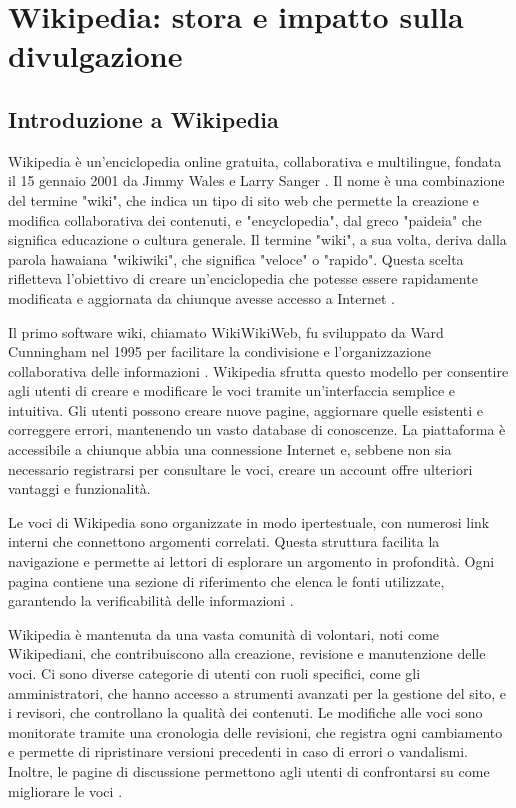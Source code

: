 \documentclass[12pt,a4paper]{report}
\begin{document}
\tableofcontents
\newpage

\chapter{Wikipedia: stora e impatto sulla divulgazione}

\section{Introduzione a Wikipedia}

Wikipedia è un'enciclopedia online gratuita, collaborativa e multilingue, fondata il 15 gennaio 2001 da Jimmy Wales e Larry Sanger \cite{lih2009wikipedia}. Il nome è una combinazione del termine "wiki", che indica un tipo di sito web che permette la creazione e modifica collaborativa dei contenuti, e "encyclopedia", dal greco "paideia" che significa educazione o cultura generale. Il termine "wiki", a sua volta, deriva dalla parola hawaiana "wikiwiki", che significa "veloce" o "rapido". Questa scelta rifletteva l'obiettivo di creare un'enciclopedia che potesse essere rapidamente modificata e aggiornata da chiunque avesse accesso a Internet \cite{cunningham2001wiki}. 

Il primo software wiki, chiamato WikiWikiWeb, fu sviluppato da Ward Cunningham nel 1995 per facilitare la condivisione e l'organizzazione collaborativa delle informazioni \cite{cunningham2001wiki}. Wikipedia sfrutta questo modello per consentire agli utenti di creare e modificare le voci tramite un'interfaccia semplice e intuitiva. Gli utenti possono creare nuove pagine, aggiornare quelle esistenti e correggere errori, mantenendo un vasto database di conoscenze. La piattaforma è accessibile a chiunque abbia una connessione Internet e, sebbene non sia necessario registrarsi per consultare le voci, creare un account offre ulteriori vantaggi e funzionalità.

Le voci di Wikipedia sono organizzate in modo ipertestuale, con numerosi link interni che connettono argomenti correlati. Questa struttura facilita la navigazione e permette ai lettori di esplorare un argomento in profondità. Ogni pagina contiene una sezione di riferimento che elenca le fonti utilizzate, garantendo la verificabilità delle informazioni \cite{denning2005wikipedia}.

Wikipedia è mantenuta da una vasta comunità di volontari, noti come Wikipediani, che contribuiscono alla creazione, revisione e manutenzione delle voci. Ci sono diverse categorie di utenti con ruoli specifici, come gli amministratori, che hanno accesso a strumenti avanzati per la gestione del sito, e i revisori, che controllano la qualità dei contenuti. Le modifiche alle voci sono monitorate tramite una cronologia delle revisioni, che registra ogni cambiamento e permette di ripristinare versioni precedenti in caso di errori o vandalismi. Inoltre, le pagine di discussione permettono agli utenti di confrontarsi su come migliorare le voci \cite{reagle2010good}.
\end{document}
